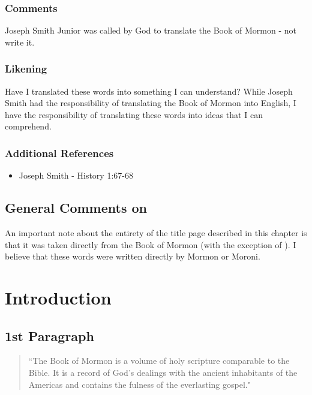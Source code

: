 \documentclass[12pt]{report}
\begin{document}
\subsection{Comments\label{titlePage:comments4}}
Joseph Smith Junior was called by God to translate the Book of Mormon - not write it.  

\subsection{Likening\label{titlePage:likening4}}
Have I translated these words into something I can understand?  While Joseph Smith had the responsibility of translating the Book of Mormon into English, I have the responsibility of translating these words into ideas that I can comprehend.

\subsection{Additional References\label{titlePage:references4}}
\begin{itemize}
\item Joseph Smith - History 1:67-68
\end{itemize}

\section{General Comments on }
An important note about the entirety of the title page described in this chapter is that it was taken directly from the Book of Mormon (with the exception of ).  I believe that these words were written directly by Mormon or Moroni.  

\chapter{Introduction\label{chapter:intro}}
\section{1st Paragraph\label{intro:1st}}
\begin{center}
\begin{quote}
``The Book of Mormon is a volume of holy scripture comparable to the Bible. It is a record of God's dealings with the ancient inhabitants of the Americas and contains the fulness of the everlasting gospel."
\end{quote}
\end{center}
\end{document}
